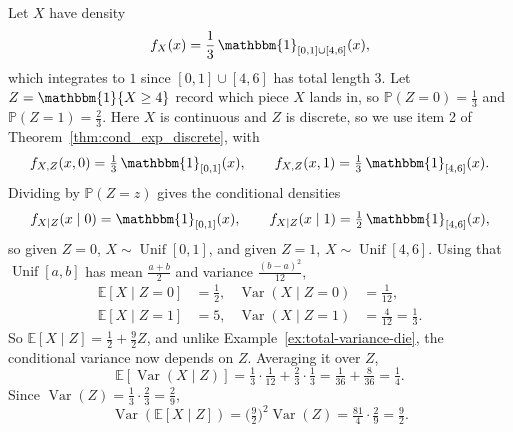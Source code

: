 	\begin{example}
		\label{ex:total-variance-two-piece-uniform}
		Let $X$ have density
		\begin{equation}
			f_X(x) = \frac{1}{3}\,\mathbbm{1}_{[0, 1] \cup [4, 6]}(x),
		\end{equation}
		which integrates to $1$ since $[0, 1] \cup [4, 6]$ has total length $3$. Let
		$Z = \mathbbm{1}\{X \geq 4\}$ record which piece $X$ lands in, so
		$\mathbb{P}(Z = 0) = \frac{1}{3}$ and $\mathbb{P}(Z = 1) = \frac{2}{3}$. Here $X$ is
		continuous and $Z$ is discrete, so we use item 2 of
		Theorem~\ref{thm:cond_exp_discrete}, with
		\begin{equation}
			f_{X, Z}(x, 0) = \tfrac{1}{3}\,\mathbbm{1}_{[0, 1]}(x),
			\qquad
			f_{X, Z}(x, 1) = \tfrac{1}{3}\,\mathbbm{1}_{[4, 6]}(x).
		\end{equation}
		Dividing by $\mathbb{P}(Z = z)$ gives the conditional densities
		\begin{equation}
			f_{X \mid Z}(x \mid 0) = \mathbbm{1}_{[0, 1]}(x),
			\qquad
			f_{X \mid Z}(x \mid 1) = \tfrac{1}{2}\,\mathbbm{1}_{[4, 6]}(x),
		\end{equation}
		so given $Z = 0$, $X \sim \operatorname{Unif}[0, 1]$, and given $Z = 1$,
		$X \sim \operatorname{Unif}[4, 6]$. Using that $\operatorname{Unif}[a, b]$ has mean
		$\frac{a + b}{2}$ and variance $\frac{(b - a)^2}{12}$,
		\begin{align}
			\mathbb{E}[X \mid Z = 0] &= \tfrac{1}{2},
			& \operatorname{Var}(X \mid Z = 0) &= \tfrac{1}{12}, \\
			\mathbb{E}[X \mid Z = 1] &= 5,
			& \operatorname{Var}(X \mid Z = 1) &= \tfrac{4}{12} = \tfrac{1}{3}.
		\end{align}
		So $\mathbb{E}[X \mid Z] = \frac{1}{2} + \frac{9}{2} Z$, and unlike
		Example~\ref{ex:total-variance-die}, the conditional variance now depends on $Z$.
		Averaging it over $Z$,
		\begin{equation}
			\mathbb{E}[\operatorname{Var}(X \mid Z)]
			= \tfrac{1}{3} \cdot \tfrac{1}{12} + \tfrac{2}{3} \cdot \tfrac{1}{3}
			= \tfrac{1}{36} + \tfrac{8}{36} = \tfrac{1}{4}.
		\end{equation}
		Since $\operatorname{Var}(Z) = \frac{1}{3} \cdot \frac{2}{3} = \frac{2}{9}$,
		\begin{equation}
			\operatorname{Var}(\mathbb{E}[X \mid Z])
			= \Big(\tfrac{9}{2}\Big)^2 \operatorname{Var}(Z) = \tfrac{81}{4} \cdot \tfrac{2}{9}
			= \tfrac{9}{2}.
		\end{equation}

\end{example}
